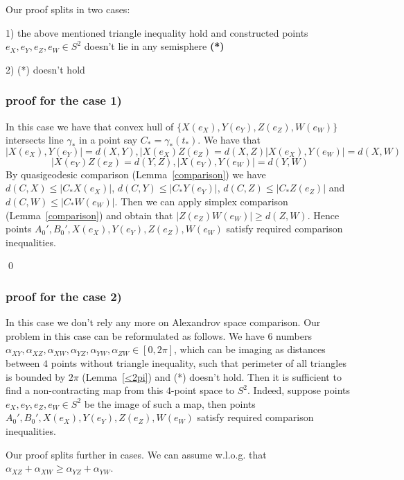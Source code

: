 \documentclass[a4paper,12pt]{article}
\theoremstyle{definition}
\theoremstyle{definition}
\theoremstyle{definition}
\begin{document}
   Our proof splits in two cases:
    
    1) the above mentioned triangle inequality hold and constructed points
     $e_X, e_Y,e_Z,e_W\in S^2$ doesn't lie in any semisphere {\bf(*)}
     
     2) (*) doesn't hold
     
     
     \subsubsection{proof for the case 1)}
     In this case we have that
     convex hull
     of $\{X(e_X), Y(e_Y), Z(e_Z), W(e_W)\}$ intersects line $\gamma_*$
     in a point say
$C_*=\gamma_*(t_*)$.      
  We have that
$$|X(e_X), Y(e_Y)|=d(X,Y),
|X(e_X)Z(e_Z)=d(X,Z)
|X(e_X), Y(e_W)|=d(X,W)$$
$$|X(e_Y)Z(e_Z)=d(Y,Z),
|X(e_Y), Y(e_W)|=d(Y,W)$$
By quasigeodesic comparison (Lemma~\ref{comparison}) we have $d(C,X)\le |C_*X(e_X)|$,
$d(C,Y)\le |C_*Y(e_Y)|$,
 $d(C,Z)\le |C_*Z(e_Z)|$ and
$d(C,W)\le |C_*W(e_W)|$.
Then we can apply
simplex comparison (Lemma~\ref{comparison}) and 
obtain
that 
$|Z(e_Z)W(e_W)|\ge d(Z,W)$.
Hence points
$A_0', B_0', X(e_X), Y(e_Y), Z(e_Z), W(e_W)$
satisfy required comparison inequalities.

       \qed\par\medskip     
     
     
     
      \subsubsection{proof for the case 2)}
      
      In this case we don't rely any more on Alexandrov space comparison.
      Our problem in this case can be reformulated as follows.
      We have $6$  numbers 
      $\alpha_{XY}, \alpha_{XZ}, \alpha_{XW}, \alpha_{YZ}, \alpha_{YW},
      \alpha_{ZW}\in[0,2\pi]$, which can be imaging as distances between 
      $4$ points without triangle inequality,  such that perimeter 
        of all triangles is bounded by $2\pi$ (Lemma~\ref{<2pi})
           and (*) doesn't hold.
           Then it is sufficient to find a non-contracting map from
           this $4$-point  space to $S^2$.
           Indeed, suppose
           points
    $e_{X}, e_{Y}, e_{Z}, e_{W}\in S^2$
    be the image of such a map,    
         then points
$A_0', B_0', X(e_X), Y(e_Y), Z(e_Z), W(e_W)$
satisfy required comparison inequalities.


Our proof splits further in cases.
We can assume w.l.o.g. that 
$\alpha_{XZ}+\alpha_{XW}\ge\alpha_{YZ}+\alpha_{YW}$.
\end{document}
